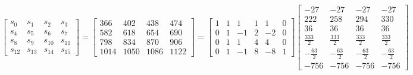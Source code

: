 \documentclass{article}%
\begin{document}
\[%
\left[\begin{matrix}s_{0} & s_{1} & s_{2} & s_{3}\\s_{4} & s_{5} & s_{6} & s_{7}\\s_{8} & s_{9} & s_{10} & s_{11}\\s_{12} & s_{13} & s_{14} & s_{15}\end{matrix}\right] = \left[\begin{matrix}366 & 402 & 438 & 474\\582 & 618 & 654 & 690\\798 & 834 & 870 & 906\\1014 & 1050 & 1086 & 1122\end{matrix}\right] = \left[\begin{matrix}1 & 1 & 1 & 1 & 1 & 0\\0 & 1 & -1 & 2 & -2 & 0\\0 & 1 & 1 & 4 & 4 & 0\\0 & 1 & -1 & 8 & -8 & 1\end{matrix}\right] \left[\begin{matrix}-27 & -27 & -27 & -27\\222 & 258 & 294 & 330\\36 & 36 & 36 & 36\\\frac{333}{2} & \frac{333}{2} & \frac{333}{2} & \frac{333}{2}\\- \frac{63}{2} & - \frac{63}{2} & - \frac{63}{2} & - \frac{63}{2}\\-756 & -756 & -756 & -756\end{matrix}\right]%
\]%
\end{document}
